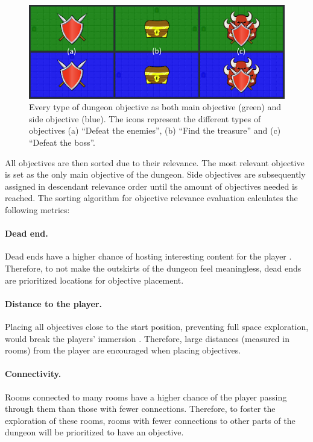 \begin{figure}[]
  \centering
  \includegraphics[width=\columnwidth]{included-papers-tex/paper-7/Figures/objectives.png}
  \caption{Every type of dungeon objective as both main objective (green) and side objective (blue). The icons represent the different types of objectives (a) “Defeat the enemies”, (b) “Find the treasure” and (c) “Defeat the boss”.}
  \label{fig:objectives}
\end{figure}

All objectives are then sorted due to their relevance. The most relevant objective is set as the only main objective of the dungeon. Side objectives are subsequently assigned in descendant relevance order until the amount of objectives needed is reached. The sorting algorithm for objective relevance evaluation calculates the following metrics:

\paragraph*{Dead end.} Dead ends have a higher chance of hosting interesting content for the player \cite{p7ashmore2007}. Therefore, to not make the outskirts of the dungeon feel meaningless, dead ends are prioritized locations for objective placement.

\paragraph*{Distance to the player.} Placing all objectives close to the start position, preventing full space exploration, would break the players’ immersion \cite{p7jenkins2004game}. Therefore, large distances (measured in rooms) from the player are encouraged when placing objectives. %

\paragraph*{Connectivity.} Rooms connected to many rooms have a higher chance of the player passing through them than those with fewer connections. Therefore, to foster the exploration of these rooms, rooms with fewer connections to other parts of the dungeon will be prioritized to have an objective.

